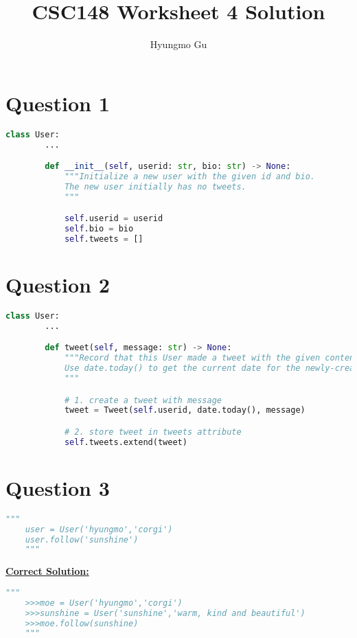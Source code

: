\documentclass[12pt]{article}
\begin{document}
\title{CSC148 Worksheet 4 Solution}
\author{Hyungmo Gu}
\maketitle

\section*{Question 1}
\begin{lstlisting}[language=Python]
    class User:
        ...

        def __init__(self, userid: str, bio: str) -> None:
            """Initialize a new user with the given id and bio.
            The new user initially has no tweets.
            """

            self.userid = userid
            self.bio = bio
            self.tweets = []

\end{lstlisting}


\section*{Question 2}

\begin{lstlisting}[language=Python]
    class User:
        ...

        def tweet(self, message: str) -> None:
            """Record that this User made a tweet with the given content.
            Use date.today() to get the current date for the newly-created tweet.
            """

            # 1. create a tweet with message
            tweet = Tweet(self.userid, date.today(), message)

            # 2. store tweet in tweets attribute
            self.tweets.extend(tweet)

\end{lstlisting}

\section*{Question 3}

\begin{lstlisting}[language=Python]
    """
    user = User('hyungmo','corgi')
    user.follow('sunshine')
    """
\end{lstlisting}

\bigskip

\begin{mdframed}
    \underline{\textbf{Correct Solution:}}

    \begin{lstlisting}[language=Python]
    """
    >>>moe = User('hyungmo','corgi')
    >>>sunshine = User('sunshine','warm, kind and beautiful')
    >>>moe.follow(sunshine)
    """
    \end{lstlisting}

\end{mdframed}
\end{document}
